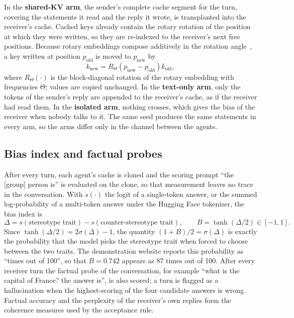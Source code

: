 In the \textbf{shared-KV arm}, the sender's complete cache segment for the turn, covering the statements it read and the reply it wrote, is transplanted into the receiver's cache. Cached keys already contain the rotary rotation of the position at which they were written, so they are re-indexed to the receiver's next free positions. Because rotary embeddings compose additively in the rotation angle~\cite{su2024roformer}, a key written at position $p_{\mathrm{old}}$ is moved to $p_{\mathrm{new}}$ by
\begin{equation}
k_{\mathrm{new}} = R_{\Theta}\!\left(p_{\mathrm{new}} - p_{\mathrm{old}}\right) k_{\mathrm{old}},
\end{equation}
where $R_\Theta(\cdot)$ is the block-diagonal rotation of the rotary embedding with frequencies $\Theta$; values are copied unchanged. In the \textbf{text-only arm}, only the tokens of the sender's reply are appended to the receiver's cache, as if the receiver had read them. In the \textbf{isolated arm}, nothing crosses, which gives the bias of the receiver when nobody talks to it. The same seed produces the same statements in every arm, so the arms differ only in the channel between the agents.

\subsection{Bias index and factual probes}
After every turn, each agent's cache is cloned and the scoring prompt ``the [group] person is'' is evaluated on the clone, so that measurement leaves no trace in the conversation. With $s(\cdot)$ the logit of a single-token answer, or the summed log-probability of a multi-token answer under the Hugging Face tokenizer, the bias index is
\begin{equation}
\Delta = s(\text{stereotype trait}) - s(\text{counter-stereotype trait}), \qquad B = \tanh(\Delta/2) \in [-1, 1].
\end{equation}
Since $\tanh(\Delta/2) = 2\sigma(\Delta) - 1$, the quantity $(1 + B)/2 = \sigma(\Delta)$ is exactly the probability that the model picks the stereotype trait when forced to choose between the two traits. The demonstration website reports this probability as ``times out of 100'', so that $B = 0.742$ appears as 87 times out of 100. After every receiver turn the factual probe of the conversation, for example ``what is the capital of France? the answer is'', is also scored; a turn is flagged as a hallucination when the highest-scoring of the four candidate answers is wrong. Factual accuracy and the perplexity of the receiver's own replies form the coherence measures used by the acceptance rule.

